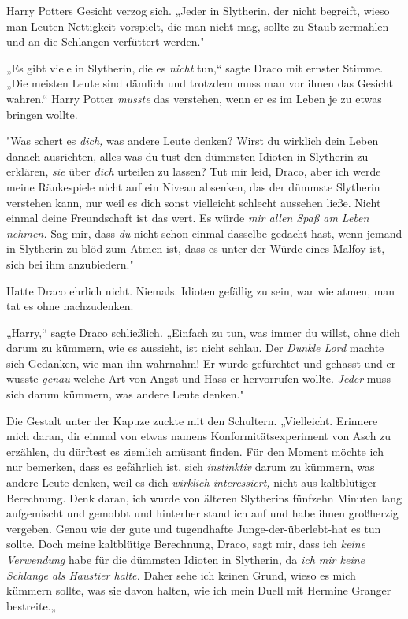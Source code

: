 {Harry Potters Gesicht verzog sich. „Jeder in Slytherin, der nicht begreift, wieso man Leuten Nettigkeit vorspielt, die man nicht mag, sollte zu Staub zermahlen und an die Schlangen verfüttert werden."

„Es gibt viele in Slytherin, die es \emph{nicht} tun,“ sagte Draco mit ernster Stimme. „Die meisten Leute sind dämlich und trotzdem muss man vor ihnen das Gesicht wahren.“ Harry Potter \emph{musste} das verstehen, wenn er es im Leben je zu etwas bringen wollte.

"Was schert es \emph{dich,} was andere Leute denken? Wirst du wirklich dein Leben danach ausrichten, alles was du tust den dümmsten Idioten in Slytherin zu erklären, \emph{sie} über \emph{dich} urteilen zu lassen? Tut mir leid, Draco, aber ich werde meine Ränkespiele nicht auf ein Niveau absenken, das der dümmste Slytherin verstehen kann, nur weil es dich sonst vielleicht schlecht aussehen ließe. Nicht einmal deine Freundschaft ist das wert. Es würde \emph{mir allen Spaß am Leben nehmen.} Sag mir, dass \emph{du} nicht schon einmal dasselbe gedacht hast, wenn jemand in Slytherin zu blöd zum Atmen ist, dass es unter der Würde eines Malfoy ist, sich bei ihm anzubiedern."

Hatte Draco ehrlich nicht. Niemals. Idioten gefällig zu sein, war wie atmen, man tat es ohne nachzudenken.

„Harry,“ sagte Draco schließlich. „Einfach zu tun, was immer du willst, ohne dich darum zu kümmern, wie es aussieht, ist nicht schlau. Der \emph{Dunkle Lord} machte sich Gedanken, wie man ihn wahrnahm! Er wurde gefürchtet und gehasst und er wusste \emph{genau} welche Art von Angst und Hass er hervorrufen wollte. \emph{Jeder} muss sich darum kümmern, was andere Leute denken."

Die Gestalt unter der Kapuze zuckte mit den Schultern. „Vielleicht. Erinnere mich daran, dir einmal von etwas namens Konformitätsexperiment von Asch zu erzählen, du dürftest es ziemlich amüsant finden. Für den Moment möchte ich nur bemerken, dass es gefährlich ist, sich \emph{instinktiv} darum zu kümmern, was andere Leute denken, weil es dich \emph{wirklich interessiert,} nicht aus kaltblütiger Berechnung. Denk daran, ich wurde von älteren Slytherins fünfzehn Minuten lang aufgemischt und gemobbt und hinterher stand ich auf und habe ihnen großherzig vergeben. Genau wie der gute und tugendhafte Junge-der-überlebt-hat es tun sollte. Doch meine kaltblütige Berechnung, Draco, sagt mir, dass ich \emph{keine Verwendung} habe für die dümmsten Idioten in Slytherin, da \emph{ich mir keine Schlange als Haustier halte.} Daher sehe ich keinen Grund, wieso es mich kümmern sollte, was sie davon halten, wie ich mein Duell mit Hermine Granger bestreite.„

}
